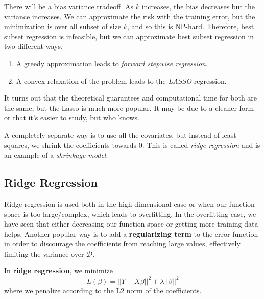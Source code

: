     There will be a bias variance tradeoff. As $k$ increases, the bias decreases but the variance increases. We can approximate the risk with the training error, but the minimization is over all subset of size $k$, and so this is NP-hard. Therefore, best subset regression is infeasible, but we can approximate best subset regression in two different ways. 
    \begin{enumerate}
      \item A greedy approximation leads to \textit{forward stepwise regression}. 
      \item A convex relaxation of the problem leads to the \textit{LASSO} regression. 
    \end{enumerate}
    It turns out that the theoretical guarantees and computational time for both are the same, but the Lasso is much more popular. It may be due to a cleaner form or that it's easier to study, but who knows. 

    A completely separate way is to use all the covariates, but instead of least squares, we shrink the coefficients towards $0$. This is called \textit{ridge regression} and is an example of a \textit{shrinkage model}. 

  \subsection{Ridge Regression} 

    Ridge regression is used both in the high dimensional case or when our function space is too large/complex, which leads to overfitting. In the overfitting case, we have seen that either decreasing our function space or getting more training data helps. Another popular way is to add a \textbf{regularizing term} to the error function in order to discourage the coefficients from reaching large values, effectively limiting the variance over $\mathcal{D}$. 

    \begin{definition}
      In \textbf{ridge regression}, we minimize 
      \begin{equation}
        L(\beta) = ||Y - X \beta||^2 + \lambda ||\beta||^2 
      \end{equation}
      where we penalize according to the L2 norm of the coefficients. 
    \end{definition}

